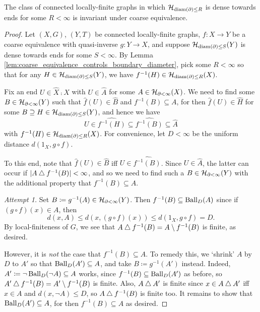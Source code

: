 \documentclass{amsart}
\begin{document}
    \begin{proposition}\label{prp:invariant_of_density_coarse_equivalence}
        The class of connected locally-finite graphs in which $\mathcal{H}_{\operatorname{diam}(\partial)\leq R}$ is dense towards ends for some $R<\infty$ is invariant under coarse equivalence.
    \end{proposition}
    \begin{proof}
        Let $(X,G)$, $(Y,T)$ be connected locally-finite graphs, $f:X\to Y$ be a coarse equivalence with quasi-inverse $g:Y\to X$, and suppose $\mathcal{H}_{\operatorname{diam}(\partial)\leq S}(Y)$ is dense towards ends for some $S<\infty$. By Lemma \ref{lem:coarse_equivalence_controls_boundary_diameter}, pick some $R<\infty$ so that for any $H\in\mathcal{H}_{\operatorname{diam}(\partial)\leq S}(Y)$, we have $f^{-1}(H)\in\mathcal{H}_{\operatorname{diam}(\partial)\leq R}(X)$.

        Fix an end $U\in\widehat{X}\comp X$ with $U\in\widehat{A}$ for some $A\in\mathcal{H}_{\partial<\infty}(X)$. We need to find some $B\in\mathcal{H}_{\partial<\infty}(Y)$ such that $\widehat{f}(U)\in\widehat{B}$ and $f^{-1}(B)\subseteq A$, for then $\widehat{f}(U)\in\widehat{H}$ for some $B\supseteq H\in\mathcal{H}_{\operatorname{diam}(\partial)\leq S}(Y)$, and hence we have
        \begin{equation*}
            U\in\widehat{f^{-1}(H)}\subseteq\widehat{f^{-1}(B)}\subseteq\widehat{A}
        \end{equation*}
        with $f^{-1}(H)\in\mathcal{H}_{\operatorname{diam}(\partial)\leq R}(X)$. For convenience, let $D<\infty$ be the uniform distance $d(1_X,g\circ f)$.

        To this end, note that $\widehat{f}(U)\in\widehat{B}$ iff $U\in\widehat{f^{-1}(B)}$. Since $U\in\widehat{A}$, the latter can occur if $|A\bigtriangleup f^{-1}(B)|<\infty$, and so we need to find such a $B\in\mathcal{H}_{\partial<\infty}(Y)$ with the additional property that $f^{-1}(B)\subseteq A$.
        \begin{leftbar}
            \textit{Attempt 1.} Set $B\coloneqq g^{-1}(A)\in\mathcal{H}_{\partial<\infty}(Y)$. Then $f^{-1}(B)\subseteq\operatorname{Ball}_D(A)$ since if $(g\circ f)(x)\in A$, then
                \begin{equation*}
                    d(x,A)\leq d(x,(g\circ f)(x))\leq d(1_X,g\circ f)=D.
                \end{equation*}
            By local-finiteness of $G$, we see that $A\bigtriangleup f^{-1}(B)=A\setminus f^{-1}(B)$ is finite, as desired.
        \end{leftbar}
        However, it is \textit{not} the case that $f^{-1}(B)\subseteq A$. To remedy this, we `shrink' $A$ by $D$ to $A'$ so that $\operatorname{Ball}_D(A')\subseteq A$, and take $B\coloneqq g^{-1}(A')$ instead. Indeed, $A'\coloneqq\lnot\operatorname{Ball}_D(\lnot A)\subseteq A$ works, since $f^{-1}(B)\subseteq\operatorname{Ball}_D(A')$ as before, so $A'\bigtriangleup f^{-1}(B)=A'\setminus f^{-1}(B)$ is finite. Also, $A\bigtriangleup A'$ is finite since $x\in A\bigtriangleup A'$ iff $x\in A$ and $d(x,\lnot A)\leq D$, so $A\bigtriangleup f^{-1}(B)$ is finite too. It remains to show that $\operatorname{Ball}_D(A')\subseteq A$, for then $f^{-1}(B)\subseteq A$ as desired.


\end{proof}
\end{document}
